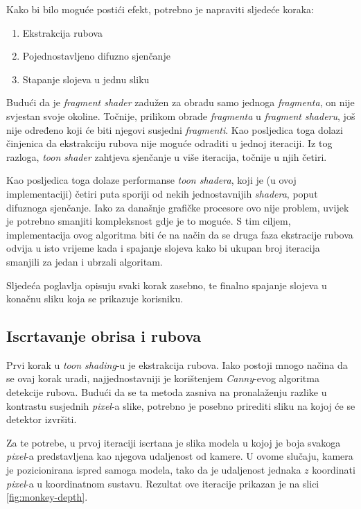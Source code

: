 Kako bi bilo moguće postići efekt, potrebno je napraviti sljedeće koraka:

\begin{enumerate}
\item Ekstrakcija rubova
\item Pojednostavljeno difuzno sjenčanje
\item Stapanje slojeva u jednu sliku
\end{enumerate}

Budući da je \emph{fragment shader} zadužen za obradu samo jednoga \emph{fragmenta}, on nije svjestan svoje okoline. Točnije, prilikom obrade \emph{fragmenta} u \emph{fragment shaderu}, još nije određeno koji će biti njegovi susjedni \emph{fragmenti}. Kao posljedica toga dolazi činjenica da ekstrakciju rubova nije moguće odraditi u jednoj iteraciji. Iz tog razloga, \emph{toon shader} zahtjeva sjenčanje u više iteracija, točnije u njih četiri.

Kao posljedica toga dolaze performanse \emph{toon shadera}, koji je (u ovoj implementaciji) četiri puta sporiji od nekih jednostavnijih \emph{shadera}, poput difuznoga sjenčanje. Iako za današnje grafičke procesore ovo nije problem, uvijek je potrebno smanjiti kompleksnost gdje je to moguće. S tim ciljem, implementacija ovog algoritma biti će na način da se druga faza ekstracije rubova odvija u isto vrijeme kada i spajanje slojeva kako bi ukupan broj iteracija smanjili za jedan i ubrzali algoritam.

Sljedeća poglavlja opisuju svaki korak zasebno, te finalno spajanje slojeva u konačnu sliku koja se prikazuje korisniku.

\subsection{Iscrtavanje obrisa i rubova}
\label{sec:edge-detection}

Prvi korak u \emph{toon shading}-u je ekstrakcija rubova. Iako postoji mnogo načina da se ovaj korak uradi, najjednostavniji je korištenjem \emph{Canny}-evog algoritma detekcije rubova. Budući da se ta metoda zasniva na pronalaženju razlike u kontrastu susjednih \emph{pixel}-a slike, potrebno je posebno prirediti sliku na kojoj će se detektor izvršiti.

Za te potrebe, u prvoj iteraciji iscrtana je slika modela u kojoj je boja svakoga \emph{pixel}-a predstavljena kao njegova udaljenost od kamere. U ovome slučaju, kamera je pozicionirana ispred samoga modela, tako da je udaljenost jednaka $z$ koordinati \emph{pixel}-a u koordinatnom sustavu. Rezultat ove iteracije prikazan je na slici \ref{fig:monkey-depth}.

